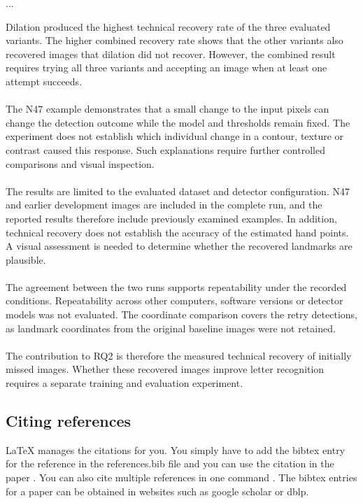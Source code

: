 \par\noindent ...\par\medskip
        Dilation produced the highest technical recovery rate of the three evaluated variants. The higher combined recovery rate shows that the other variants also recovered images that dilation did not recover. However, the combined result requires trying all three variants and accepting an image when at least one attempt succeeds.
        \\\\
        The N47 example demonstrates that a small change to the input pixels can change the detection outcome while the model and thresholds remain fixed. The experiment does not establish which individual change in a contour, texture or contrast caused this response. Such explanations require further controlled comparisons and visual inspection.
        \\\\
        The results are limited to the evaluated dataset and detector configuration. N47 and earlier development images are included in the complete run, and the reported results therefore include previously examined examples. In addition, technical recovery does not establish the accuracy of the estimated hand points. A visual assessment is needed to determine whether the recovered landmarks are plausible.
        \\\\
        The agreement between the two runs supports repeatability under the recorded conditions. Repeatability across other computers, software versions or detector models was not evaluated. The coordinate comparison covers the retry detections, as landmark coordinates from the original baseline images were not retained.
        \\\\
        The contribution to RQ2 is therefore the measured technical recovery of initially missed images. Whether these recovered images improve letter recognition requires a separate training and evaluation experiment.
        
\iffalse
    \subsection{Citing references}
        LaTeX manages the citations for you. You simply have to add the bibtex entry for the reference in the references.bib file and you can use the citation in the paper \cite{langley00}. You can also cite multiple references in one command \cite{DudaHart2nd,Newell81,kearns89}. The bibtex entries for a paper can be obtained in websites such as google scholar or dblp.
        
